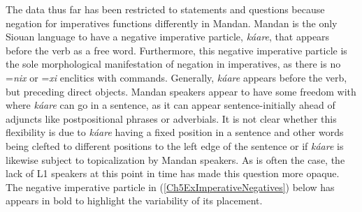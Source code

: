 The data thus far has been restricted to statements and questions because negation for imperatives functions differently in Mandan. Mandan is the only Siouan language to have a negative imperative particle, \textit{káare}, that appears before the verb as a free word. Furthermore, this negative imperative particle is the sole morphological manifestation of negation in imperatives, as there is no =\textit{nix} or =\textit{xi} enclitics with commands. Generally, \textit{káare} appears before the verb, but preceding direct objects. Mandan speakers appear to have some freedom with where \textit{káare} can go in a sentence, as it can appear sentence-initially ahead of adjuncts like postpositional phrases or adverbials. It is not clear whether this flexibility is due to \textit{káare} having a fixed position in a sentence and other words being clefted to different positions to the left edge of the sentence or if \textit{káare} is likewise subject to topicalization by Mandan speakers. As is often the case, the lack of L1 speakers at this point in time has made this question more opaque. The negative imperative particle in (\ref{Ch5ExImperativeNegatives}) below has appears in bold to highlight the variability of its placement.

